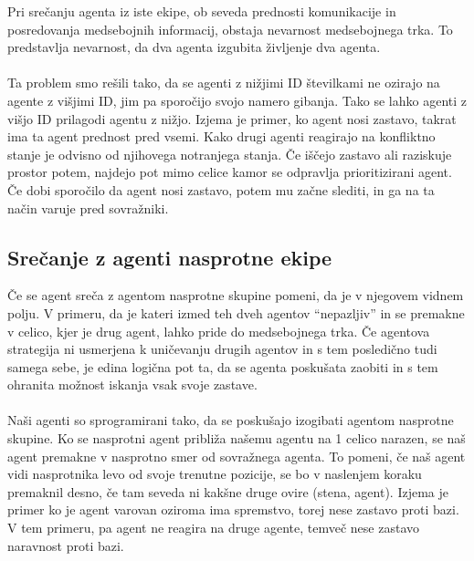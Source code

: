 \documentclass[12pt,a4paper,openany]{book}
\begin{document}
Pri srečanju agenta iz iste ekipe, ob seveda prednosti komunikacije in posredovanja  medsebojnih informacij,
obstaja nevarnost medsebojnega trka. To predstavlja nevarnost, da dva agenta izgubita življenje dva agenta.\\
\\
Ta problem smo rešili tako, da se agenti z nižjimi ID številkami ne ozirajo na agente z višjimi ID, jim pa 
sporočijo svojo namero gibanja. Tako se lahko agenti z višjo ID prilagodi agentu z nižjo. Izjema je primer, 
ko agent nosi zastavo, takrat ima ta agent prednost pred vsemi. Kako drugi agenti reagirajo na konfliktno 
stanje je odvisno od njihovega notranjega stanja. Če iščejo zastavo ali raziskuje prostor potem, najdejo pot 
mimo celice kamor se odpravlja prioritizirani agent. Če dobi sporočilo da agent nosi zastavo, potem mu začne 
slediti, in ga na ta način varuje pred sovražniki.

\subsection{Srečanje z agenti nasprotne ekipe}
Če se agent sreča z agentom nasprotne skupine pomeni, da je v njegovem vidnem polju.
V primeru, da je kateri izmed teh dveh agentov “nepazljiv” in se premakne v celico, 
kjer je drug agent, lahko pride do medsebojnega trka. Če agentova strategija ni usmerjena k
uničevanju drugih agentov in s tem posledično tudi samega sebe, je edina logična pot ta, da
se agenta poskušata zaobiti in s tem ohranita možnost iskanja vsak svoje zastave.\\
\\
Naši agenti so sprogramirani tako, da se poskušajo izogibati agentom nasprotne skupine. 
Ko se nasprotni agent približa našemu agentu na 1 celico narazen, se naš agent premakne 
v nasprotno smer od sovražnega agenta. To pomeni, če naš agent vidi nasprotnika levo od 
svoje trenutne pozicije, se bo v naslenjem koraku premaknil desno, če tam seveda ni kakšne 
druge ovire (stena, agent). Izjema je primer ko je agent varovan oziroma ima spremstvo, torej
nese zastavo proti bazi. V tem primeru, pa agent ne reagira na druge agente, temveč nese zastavo
naravnost proti bazi.
\newpage



\listoffigures

\newpage
\end{document}
